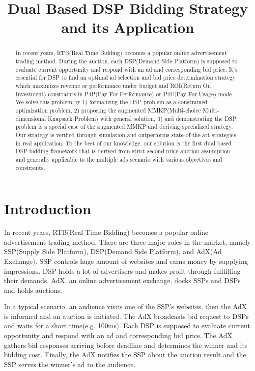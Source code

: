 \documentclass[sigconf]{acmart}
\begin{document}
\title{Dual Based DSP Bidding Strategy and its Application}

\begin{abstract}
In recent years, RTB(Real Time Bidding) becomes a popular online advertisement trading method.
During the auction, each DSP(Demand Side Platform) is supposed to
    evaluate current opportunity and respond with an ad and corresponding bid price.
It's essential for DSP to find an optimal ad selection and bid price determination strategy
    which maximizes revenue or performance under budget and ROI(Return On Investment) constraints
    in P4P(Pay For Performance) or P4U(Pay For Usage) mode.
We solve this problem by
    1) formalizing the DSP problem as a constrained optimization problem,
    2) proposing the augmented MMKP(Multi-choice Multi-dimensional Knapsack Problem) with general solution,
    3) and demonstrating the DSP problem is a special case of the augmented MMKP and deriving specialized strategy.
Our strategy is verified through simulation and outperforms state-of-the-art strategies in real application.
To the best of our knowledge, our solution is the first dual based DSP bidding framework
    that is derived from strict second price auction assumption and
    generally applicable to the multiple ads scenario with various objectives and constraints.
\end{abstract}


\maketitle

\section{Introduction} \label{Introduction}

In recent years, RTB(Real Time Bidding) becomes a popular online advertisement trading method.
There are three major roles in the market, namely SSP(Supply Side Platform), DSP(Demand Side Platform), and AdX(Ad Exchange).
SSP controls huge amount of websites and earns money by supplying impressions.
DSP holds a lot of advertisers and makes profit through fullfilling their demands.
AdX, an online advertisement exchange, docks SSPs and DSPs and holds auctions.

In a typical scenario, an audience visits one of the SSP's websites, then the AdX is informed and an auction is initiated.
The AdX broadcasts bid request to DSPs and waits for a short time(e.g. 100ms).
Each DSP is supposed to evaluate current opportunity and respond with an ad and corresponding bid price.
The AdX gathers bid responses arriving before deadline and determines the winner and its bidding cost.
Finally, the AdX notifies the SSP about the auction result and the SSP serves the winner's ad to the audience.
\end{document}
